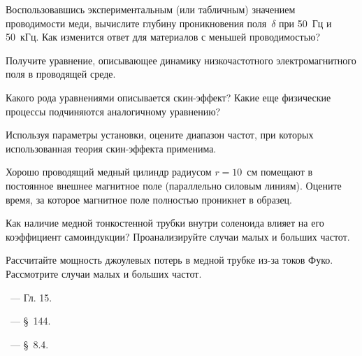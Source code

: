 \begin{lab:questions}
\item Воспользовавшись экспериментальным (или табличным) значением
проводимости меди, вычислите глубину проникновения поля~$\delta$
при 50~Гц и 50~кГц. Как изменится ответ для материалов с меньшей
проводимостью?

\item Получите уравнение, описывающее динамику низкочастотного электромагнитного
поля в проводящей среде.

\item Какого рода уравнениями описывается скин-эффект? Какие еще физические
процессы подчиняются аналогичному уравнению?

\item Используя параметры установки, оцените диапазон частот,
при которых использованная теория скин-эффекта применима.

\item Хорошо проводящий медный цилиндр радиусом $r=10$~см помещают в постоянное внешнее магнитное поле
(параллельно силовым линиям). Оцените время, за которое магнитное поле полностью проникнет в образец.

\item Как наличие медной тонкостенной трубки внутри соленоида влияет
на его коэффициент самоиндукции?
Проанализируйте случаи малых и больших частот.

\item Рассчитайте мощность джоулевых потерь в медной трубке из-за токов Фуко.
Рассмотрите случаи малых и больших частот.
%

%
%

\end{lab:questions}


\begin{lab:literature}
\item \Kirichenko~--- Гл. 15.

\item \SivuhinIII~--- \S~144.

\item \KingLokOlh~--- \S~8.4.
\end{lab:literature}
